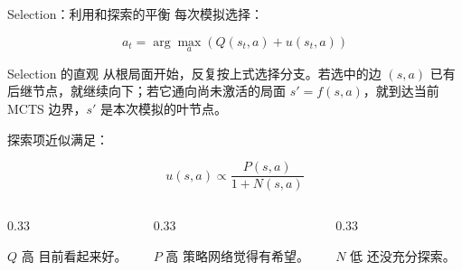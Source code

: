 \documentclass[UTF8,aspectratio=169,10pt]{ctexbeamer}
\begin{document}
\begin{frame}{Selection：利用和探索的平衡}
  每次模拟选择：

  \[
    a_t = \arg\max_a \left(Q(s_t,a) + u(s_t,a)\right)
  \]

  \begin{block}{Selection 的直观}
    从根局面开始，反复按上式选择分支。若选中的边 $(s,a)$ 已有后继节点，就继续向下；若它通向尚未激活的局面 $s'=f(s,a)$，就到达当前 MCTS 边界，$s'$ 是本次模拟的叶节点。
  \end{block}

  探索项近似满足：

  \[
    u(s,a) \propto \frac{P(s,a)}{1+N(s,a)}
  \]

  \begin{columns}[T,onlytextwidth]
    \begin{column}{0.33\textwidth}
      \begin{block}{$Q$ 高}
        目前看起来好。
      \end{block}
    \end{column}
    \begin{column}{0.33\textwidth}
      \begin{block}{$P$ 高}
        策略网络觉得有希望。
      \end{block}
    \end{column}
    \begin{column}{0.33\textwidth}
      \begin{block}{$N$ 低}
        还没充分探索。
      \end{block}
    \end{column}
  \end{columns}

\end{frame}
\end{document}
